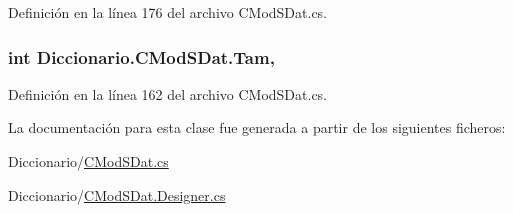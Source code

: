 Definición en la línea 176 del archivo C\-Mod\-S\-Dat.\-cs.

\hypertarget{class_diccionario_1_1_c_mod_s_dat_a894b3b04872b841fc84cc3271c37e2d8}{
\subsubsection[{Tam}]{\setlength{\rightskip}{0pt plus 5cm}int Diccionario.\-C\-Mod\-S\-Dat.\-Tam\hspace{0.3cm}{\ttfamily [get]}, {\ttfamily [set]}}}\label{class_diccionario_1_1_c_mod_s_dat_a894b3b04872b841fc84cc3271c37e2d8}


Definición en la línea 162 del archivo C\-Mod\-S\-Dat.\-cs.



La documentación para esta clase fue generada a partir de los siguientes ficheros\-:\begin{DoxyCompactItemize}
\item 
Diccionario/\hyperlink{_c_mod_s_dat_8cs}{C\-Mod\-S\-Dat.\-cs}\item 
Diccionario/\hyperlink{_c_mod_s_dat_8_designer_8cs}{C\-Mod\-S\-Dat.\-Designer.\-cs}\end{DoxyCompactItemize}
